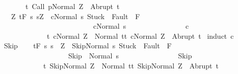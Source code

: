 \begin{isabellebody}
\ \ \ \ \ \ \ {\isacharbraceleft}t{\isachardot}\ {\isasymGamma}{\isasymturnstile}{\isasymlangle}Call\ p{\isacharcomma}Normal\ Z{\isasymrangle}\ {\isasymRightarrow}\ Abrupt\ t{\isacharbraceright}{\isachardoublequoteclose}\isanewline
\ \ \ {\isachardoublequoteopen}{\isasymAnd}Z{\isachardot}\ {\isasymGamma}{\isacharcomma}{\isasymTheta}{\isasymturnstile}\isactrlsub t\isactrlbsub {\isacharslash}F\isactrlesub \ {\isacharbraceleft}s{\isachardot}\ s{\isacharequal}Z\ {\isasymand}\ {\isasymGamma}{\isasymturnstile}{\isasymlangle}c{\isacharcomma}Normal\ s{\isasymrangle}\ {\isasymRightarrow}{\isasymnotin}{\isacharparenleft}{\isacharbraceleft}Stuck{\isacharbraceright}\ {\isasymunion}\ Fault\ {\isacharbackquote}\ {\isacharparenleft}{\isacharminus}F{\isacharparenright}{\isacharparenright}\ {\isasymand}\ \isanewline
\ \ \ \ \ \ \ \ \ \ \ \ \ \ \ \ \ \ \ \ \ \ \ \ \ \ {\isasymGamma}{\isasymturnstile}c{\isasymdown}Normal\ s{\isacharbraceright}\ \isanewline
\ \ \ \ \ \ \ \ \ \ \ \ \ \ \ c\ \isanewline
\ \ \ \ \ \ \ \ \ \ \ \ \ {\isacharbraceleft}t{\isachardot}\ {\isasymGamma}{\isasymturnstile}{\isasymlangle}c{\isacharcomma}Normal\ Z{\isasymrangle}\ {\isasymRightarrow}\ Normal\ t{\isacharbraceright}{\isacharcomma}{\isacharbraceleft}t{\isachardot}\ {\isasymGamma}{\isasymturnstile}{\isasymlangle}c{\isacharcomma}Normal\ Z{\isasymrangle}\ {\isasymRightarrow}\ Abrupt\ t{\isacharbraceright}{\isachardoublequoteclose}\isanewline
%
\isadelimproof
%
\endisadelimproof
%
\isatagproof
{}\isamarkupfalse%
\ {\isacharparenleft}induct\ c{\isacharparenright}\isanewline
\ \ \isamarkupfalse%
\ Skip\isanewline
\ \ \isamarkupfalse%
\ {\isachardoublequoteopen}{\isasymGamma}{\isacharcomma}{\isasymTheta}{\isasymturnstile}\isactrlsub t\isactrlbsub {\isacharslash}F\isactrlesub \ {\isacharbraceleft}s{\isachardot}\ s\ {\isacharequal}\ Z\ {\isasymand}\ {\isasymGamma}{\isasymturnstile}{\isasymlangle}Skip{\isacharcomma}Normal\ s{\isasymrangle}\ {\isasymRightarrow}{\isasymnotin}{\isacharparenleft}{\isacharbraceleft}Stuck{\isacharbraceright}\ {\isasymunion}\ Fault\ {\isacharbackquote}\ {\isacharparenleft}{\isacharminus}F{\isacharparenright}{\isacharparenright}\ {\isasymand}\ \isanewline
\ \ \ \ \ \ \ \ \ \ \ \ \ \ \ \ \ \ \ {\isasymGamma}{\isasymturnstile}Skip\ {\isasymdown}\ Normal\ s{\isacharbraceright}\ \isanewline
\ \ \ \ \ \ \ \ \ \ \ \ \ \ \ Skip\isanewline
\ \ \ \ \ \ \ \ \ \ \ \ {\isacharbraceleft}t{\isachardot}\ {\isasymGamma}{\isasymturnstile}{\isasymlangle}Skip{\isacharcomma}Normal\ Z{\isasymrangle}\ {\isasymRightarrow}\ Normal\ t{\isacharbraceright}{\isacharcomma}{\isacharbraceleft}t{\isachardot}\ {\isasymGamma}{\isasymturnstile}{\isasymlangle}Skip{\isacharcomma}Normal\ Z{\isasymrangle}\ {\isasymRightarrow}\ Abrupt\ t{\isacharbraceright}{\isachardoublequoteclose}\isanewline

\end{isabellebody}
